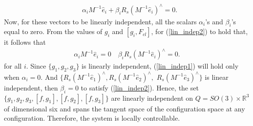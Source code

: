 \documentclass{ifacconf}
\begin{document}
\begin{align}
& \alpha_{i}M^{-1}\hat{e}_{i} + \beta_{i}R_{s}(M^{-1}\hat{e}_{i})^{\wedge}=0. \label{lin_indep2}
\end{align}
Now, for these vectors to be linearly independent, all the scalars  $\alpha_{i}$'s and $\beta_{i}$'s equal to zero. From the values of $g_{i}$ and  $[g_{i},F_{cl}]$, for (\ref{lin_indep2}) to hold  that, it follows that
\begin{align}\label{lin_indep1}
\alpha_{i}M^{-1}\hat{e}_{i}  = 0 \quad \beta_{i}R_{s}(M^{-1}\hat{e}_{i})^{\wedge}=0. 
\end{align}
for all $i$. Since $\{g_{1},g_{2},g_{3}\}$ is linearly independent, (\ref{lin_indep1}) will hold only when $\alpha_{i}=0$.  And $\{R_{s}(M^{-1}\hat{e}_{1})^{\wedge},R_{s}(M^{-1}\hat{e}_{2})^{\wedge},$  $R_{s}(M^{-1}\hat{e}_{3})^{\wedge}\}$ is linear independent, then $\beta_{i}=0$ to satisfy (\ref{lin_indep2}). Hence, the set
$\{ g_{1},g_{2},g_{3},[f,g_{1}],[f,g_{2}],[f,g_{3}]\}$ 
are linearly independent on $Q =SO(3)\times \mathbb{R}^{3}$ of dimensional six and spans the tangent space of the configuration space at any configuration. Therefore, the system is locally controllable. 
\end{document}
